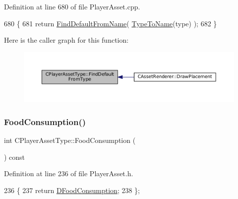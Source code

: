 Definition at line 680 of file Player\+Asset.\+cpp.


\begin{DoxyCode}
680                                                                                       \{
681     \textcolor{keywordflow}{return} \hyperlink{classCPlayerAssetType_a7e1684eac4efaf7afe9a5c15af262b33}{FindDefaultFromName}( \hyperlink{classCPlayerAssetType_a66ce89c35b74940e9fc947a1f4b9e770}{TypeToName}(type) );
682 \}
\end{DoxyCode}
Here is the caller graph for this function\+:\nopagebreak
\begin{figure}[H]
\begin{center}
\leavevmode
\includegraphics[width=350pt]{classCPlayerAssetType_a7b3c6682f379bfcd974342329eaabab9_icgraph}
\end{center}
\end{figure}
\hypertarget{classCPlayerAssetType_aa42527737b1518ce4d5aa8533bd9bb30}{}\label{classCPlayerAssetType_aa42527737b1518ce4d5aa8533bd9bb30} 
\subsubsection{\texorpdfstring{Food\+Consumption()}{FoodConsumption()}}
{\footnotesize\ttfamily int C\+Player\+Asset\+Type\+::\+Food\+Consumption (\begin{DoxyParamCaption}{ }\end{DoxyParamCaption}) const\hspace{0.3cm}{\ttfamily [inline]}}



Definition at line 236 of file Player\+Asset.\+h.


\begin{DoxyCode}
236                                    \{
237             \textcolor{keywordflow}{return} \hyperlink{classCPlayerAssetType_a8fcab35c2b576476b6f2c80c8b8762fb}{DFoodConsumption};  
238         \};
\end{DoxyCode}
\hypertarget{classCPlayerAssetType_ad8458f72d16825d3c677a75967cf6227}{}\label{classCPlayerAssetType_ad8458f72d16825d3c677a75967cf6227} 
